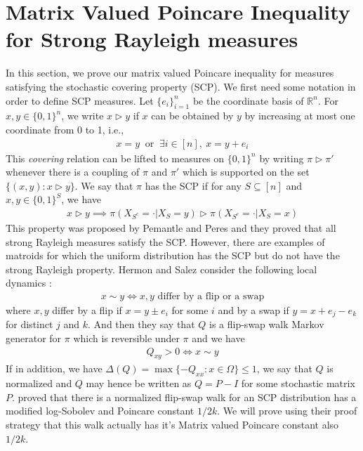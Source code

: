 \section{Matrix Valued Poincare Inequality for Strong Rayleigh measures}
In this section, we prove our matrix valued Poincare inequality for measures satisfying the stochastic covering property (SCP). We first need some notation in order to define SCP measures. Let $\{e_i\}_{i=1}^{n}$ be the coordinate basis of $\mathbb{R}^n$. For $x,y \in \{ 0,1\}^n$, we write $x\triangleright y$ if $x$ can be obtained by $y$ by increasing at most one coordinate from 0 to 1, i.e.,
\begin{align*}
  x=y \ \text{ or } \ \exists i \in [n], \ x=y+e_i
\end{align*}
This \textit{covering} relation can be lifted to measures on $\{ 0,1\}^n$ by writing $\pi \triangleright \pi'$ whenever there is a coupling of $\pi$ and $\pi'$ which is supported on the set $\{(x,y): x \triangleright y\}$. We say that $\pi$ has the SCP if for any $S \subseteq [n]$ and $x,y \in \{0,1\}^S$, we have
\begin{align*}
  x \triangleright y \implies \pi(X_{S^c} = \cdot | X_S = y)\triangleright \pi(X_{S^c} = \cdot | X_S = x)
\end{align*}
This property was proposed by Pemantle and Peres \cite{PP14} and they proved that all strong Rayleigh measures satisfy the SCP. However, there are examples of matroids for which the uniform distribution has the SCP but do not have the strong Rayleigh property. Hermon and Salez \cite{HS19} consider the following local dynamics :
\begin{align*}
  x \sim y \iff x,y \text{ differ by a flip or a swap}
\end{align*}
where $x,y$ differ by a flip if $x=y \pm e_i$ for some $i$ and by a swap if $y=x+e_j-e_k$ for distinct $j$ and $k$. And then they say that $Q$ is a flip-swap walk Markov generator for $\pi$ which is reversible under $\pi$ and we have
\begin{align*}
  Q_{xy} > 0 \iff x\sim y
\end{align*}
If in addition, we have $\Delta(Q) = \max\{-Q_{xx} : x \in \Omega\} \leq 1$, we say that $Q$ is normalized and $Q$ may hence be written as $Q=P-I$ for some stochastic matrix $P$. \cite{HS19} proved that there is a normalized flip-swap walk for an SCP distribution has a modified log-Sobolev and Poincare constant $1/2k$. We will prove using their proof strategy that this walk actually has it's Matrix valued Poincare constant also $1/2k$.
